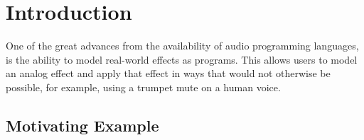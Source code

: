 \section{Introduction}

One of the great advances from the availability of audio programming languages, is the ability to model real-world effects as programs.
This allows users to model an analog effect and apply that effect in ways that would not otherwise be possible, for example, using a trumpet mute on a human voice.



\subsection{Motivating Example}

